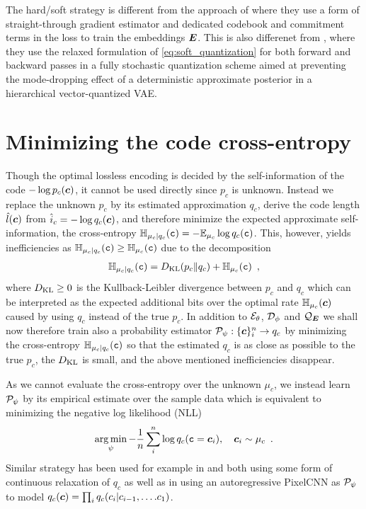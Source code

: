 \documentclass{article} %
\renewcommand{\rvc}{\mathtt{c}}
\newcommand{\pc}{p_c}
\newcommand{\qc}{q_c}
\newcommand{\muc}{\mu_c}
\newcommand{\Hc}{\sH_{\muc}}
\newcommand{\cHc}{\sH_{\muc|\qc}}
\newcommand{\gEt}{\gE_\theta}
\newcommand{\gQE}{\gQ_\mE}
\newcommand{\gDp}{\gD_\phi}
\newcommand{\gPp}{\gP_{\psi}}
\begin{document}
The hard/soft strategy is different from the approach of \citet{oordNeuralDiscreteRepresentation2017} where they use a form of straight-through gradient estimator and dedicated codebook and commitment terms in the loss to train the embeddings ${\bm{E}}$.
This is also differenet from \citet{williamsHierarchicalQuantizedAutoencoders2020}, where they use the relaxed formulation of \eqref{eq:soft_quantization} for both forward and backward passes in a fully stochastic quantization scheme aimed at preventing the mode-dropping effect of a deterministic approximate posterior in a hierarchical vector-quantized VAE.


\section{Minimizing the code cross-entropy}

Though the optimal lossless encoding is decided by the self-information of the code $-\log \pc(\vc)$, it cannot be used directly since $\pc$ is unknown.
Instead we replace the unknown $\pc$ by its estimated approximation
$\qc$, derive the code length $\hat{l}({\bm{c}})$ from $\hat{i}_c = - \log \qc(\vc)$, and therefore minimize the expected approximate self-information, the cross-entropy $\cHc(\rvc) = - \E_{\muc} \log \qc(\rvc)$.
This, however, yields inefficiencies as $\cHc(\rvc) \geq \Hc(\rvc)$ due to the decomposition
\begin{align}\label{eq:crossentropy_KL}
\cHc(\rvc) = \KL(\pc \Vert \qc) + \Hc(\rvc) \enspace ,
\end{align}
where $D_{\mathrm{KL}} \geq 0$ is the Kullback-Leibler divergence between $\pc$ and $\qc$ which can be interpreted as the expected additional bits over the optimal rate $\Hc(\vc)$ caused by using $\qc$ instead of the true $\pc$.
In addition to $\gEt$, $\gDp$ and $\gQE$ we shall now therefore train also a probability estimator $\gPp : \{\vc\}_i^n \to \qc$ by minimizing the cross-entropy $\cHc(\rvc)$ so that the estimated $\qc$ is as close as possible to the true $\pc$, the $D_{\mathrm{KL}}$ is small, and the above mentioned inefficiencies disappear.

As we cannot evaluate the cross-entropy over the unknown $\muc$, we instead learn $\gPp$ by its empirical estimate over the sample data which is equivalent to minimizing the negative log likelihood (NLL)
\begin{align}\label{eq:empirical_crossentropy}
\argmin_\psi - \frac{1}{n}\sum_i^n \log \qc(\rvc = \vc_i), \quad \vc_i \sim \muc \enspace .
\end{align}
Similar strategy has been used for example in \citet{theisLossyImageCompression2017} and \citet{balleEndtoendOptimizedImage2017} both using some form of continuous relaxation of $\qc$ as well as in \citet{mentzerConditionalProbabilityModels2018} using an autoregressive PixelCNN as $\gPp$ to model $\qc(\vc) = \prod_i \qc(\evc_i | \evc_{i-1}, \ldots. \evc_1)$.
\end{document}
